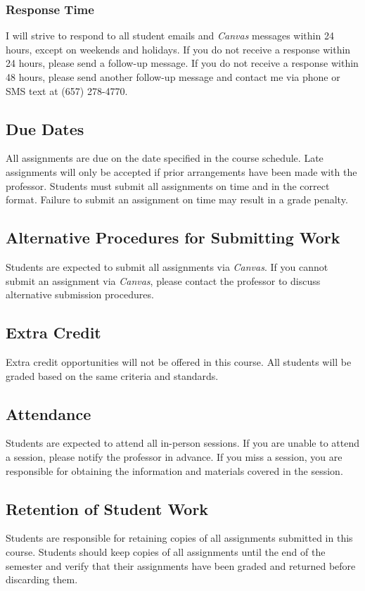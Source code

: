 \documentclass[11pt, letterpaper]{article}
\begin{document}
\subsubsection*{Response Time}I will strive to respond to all student emails and \emph{Canvas} messages within 24 hours, except on weekends and holidays. If you do not receive a response within 24 hours, please send a follow-up message. If you do not receive a response within 48 hours, please send another follow-up message and contact me via phone or SMS text at (657) 278-4770.

\subsection*{Due Dates}
All assignments are due on the date specified in the course schedule. Late assignments will only be accepted if prior arrangements have been made with the professor. Students must submit all assignments on time and in the correct format. Failure to submit an assignment on time may result in a grade penalty.

\subsection*{Alternative Procedures for Submitting Work}
Students are expected to submit all assignments via \emph{Canvas}. If you cannot submit an assignment via \emph{Canvas}, please contact the professor to discuss alternative submission procedures.

\subsection*{Extra Credit}
Extra credit opportunities will not be offered in this course. All students will be graded based on the same criteria and standards.

\subsection*{Attendance}
Students are expected to attend all in-person sessions. If you are unable to attend a session, please notify the professor in advance. If you miss a session, you are responsible for obtaining the information and materials covered in the session.

\subsection*{Retention of Student Work}
Students are responsible for retaining copies of all assignments submitted in this course. Students should keep copies of all assignments until the end of the semester and verify that their assignments have been graded and returned before discarding them.
\end{document}
